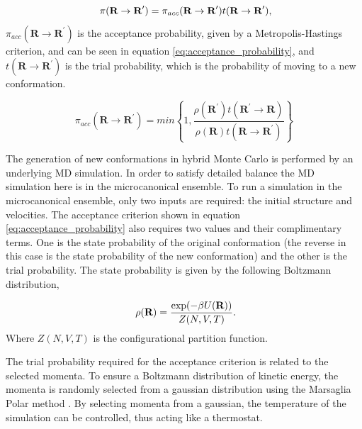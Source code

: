 \begin{equation} \label{eq:transition_probability}
 \  \pi(\textbf{R}\rightarrow\textbf{R}^\prime)=\pi_{acc}(\textbf{R}\rightarrow\textbf{R}^{\prime})t(\textbf{R}\rightarrow\textbf{R}^\prime) \\,
\end{equation}
%
$\pi_{acc}(\textbf{R}\rightarrow\textbf{R}^{\prime})$ is the acceptance probability, given by a Metropolis-Hastings criterion, and can be seen in equation \ref{eq:acceptance_probability}, and $t(\textbf{R}\rightarrow\textbf{R}^\prime)$ is the trial probability, which is the probability of moving to a new conformation.

\begin{equation} \label{eq:acceptance_probability}
 \pi_{acc}(\textbf{R}\rightarrow\textbf{R}^{\prime})=min \left\{ 1, \frac{\rho(\textbf{R}^{\prime})t(\textbf{R}^{\prime}\rightarrow\textbf{R})}{\rho(\textbf{R})t(\textbf{R}\rightarrow\textbf{R}^{\prime})} \right\}
\end{equation}

The generation of new conformations in hybrid Monte Carlo is performed by an underlying MD simulation.  In order to satisfy detailed balance the MD simulation here is in the microcanonical ensemble.  To run a simulation in the microcanonical ensemble, only two inputs are required: the initial structure and velocities.  The acceptance criterion shown in equation \ref{eq:acceptance_probability} also requires two values and their complimentary terms.  One is the state probability of the original conformation (the reverse in this case is the state probability of the new conformation) and the other is the trial probability.  The state probability is given by the following Boltzmann distribution,

\begin{equation} \label{eq:state_probability}
 \ \rho(\textbf{R})=\frac{\exp(-\beta U(\textbf{R}))}{Z(N,V,T)} \\.
\end{equation}
%
Where $Z(N,V,T)$ is the configurational partition function.

The trial probability required for the acceptance criterion is related to the selected momenta.  To ensure a Boltzmann distribution of kinetic energy, the momenta is randomly selected from a gaussian distribution using the Marsaglia Polar method \cite{Maraglia_polar_method}.  By selecting momenta from a gaussian, the temperature of the simulation can be controlled, thus acting like a thermostat.

